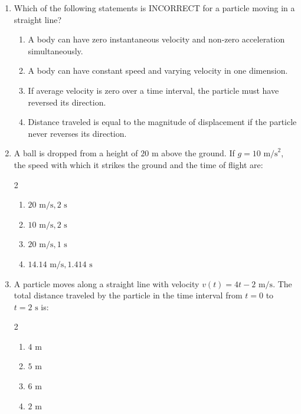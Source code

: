 \documentclass[11pt,a4paper]{article}
\begin{document}
\begin{enumerate}[label=\textbf{\textcolor{l1Green}{Q\arabic*.}},leftmargin=24pt,itemsep=10pt]
  \item Which of the following statements is INCORRECT for a particle moving in a straight line?
  \begin{enumerate}[label=\textbf{\textcolor{primaryDark}{(\Alph*)}},itemsep=2pt]
    \item A body can have zero instantaneous velocity and non-zero acceleration simultaneously.
    \item A body can have constant speed and varying velocity in one dimension.
    \item If average velocity is zero over a time interval, the particle must have reversed its direction.
    \item Distance traveled is equal to the magnitude of displacement if the particle never reverses its direction.
  \end{enumerate}

  \item A ball is dropped from a height of $20\text{ m}$ above the ground. If $g = 10\text{ m/s}^2$, the speed with which it strikes the ground and the time of flight are:
  \begin{multicols}{2}
  \begin{enumerate}[label=\textbf{\textcolor{primaryDark}{(\Alph*)}},itemsep=2pt]
    \item $20\text{ m/s}, 2\text{ s}$
    \item $10\text{ m/s}, 2\text{ s}$
    \item $20\text{ m/s}, 1\text{ s}$
    \item $14.14\text{ m/s}, 1.414\text{ s}$
  \end{enumerate}
  \end{multicols}

  \item A particle moves along a straight line with velocity $v(t) = 4t - 2\text{ m/s}$. The total distance traveled by the particle in the time interval from $t = 0$ to $t = 2\text{ s}$ is:
  \begin{multicols}{2}
  \begin{enumerate}[label=\textbf{\textcolor{primaryDark}{(\Alph*)}},itemsep=2pt]
    \item $4\text{ m}$
    \item $5\text{ m}$
    \item $6\text{ m}$
    \item $2\text{ m}$
  \end{enumerate}
  \end{multicols}

\end{enumerate}
\end{document}
